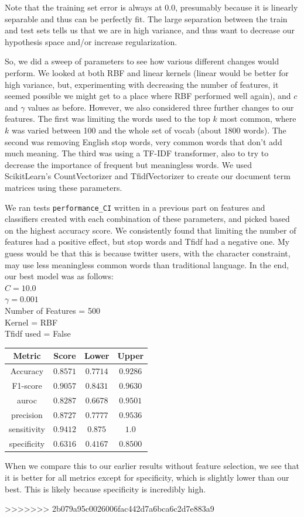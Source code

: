 \documentclass[11pt]{article}
\begin{document}
\begin{enumerate}
Note that the training set error is always at 0.0, presumably because it is linearly separable and thus can be 
perfectly fit. The large separation between the train and test sets tells us that we are in high variance, and 
thus want to decrease our hypothesis space and/or increase regularization.

So, we did a sweep of parameters to see how various different changes would perform. We looked at 
both RBF and linear kernels (linear would be better for high variance, but, experimenting with decreasing the number of features, it seemed possible we might get to a place where RBF performed well again), and $c$
and $\gamma$ values as before. However, we also considered three further changes to our features. The 
first was limiting the words used to the top $k$ most common, where $k$ was varied between 100 and the whole
set of vocab (about 1800 words). The second was removing English stop words, very common words that don't add much meaning. The third was using a TF-IDF transformer, also to try to decrease the importance of frequent but meaningless words. We used ScikitLearn's CountVectorizer and TfidfVectorizer to create our document term matrices using these parameters. 

We ran tests \texttt{performance\_CI} written in a previous part on features and classifiers created with each combination of these parameters, and picked based on the highest accuracy score. We consistently found that limiting the number of features had a positive effect, but stop words and Tfidf had a negative one. My guess would be that this is because twitter users, with the character constraint, may use less meaningless common words than traditional language. In the end, our best model was as follows:
\\$C=10.0$
\\$\gamma = 0.001$
\\Number of Features = 500
\\Kernel = RBF
\\ Tfidf used = False

\begin{tabular}{| c | c | c | c |}
\hline
Metric & Score & Lower & Upper \\
\hline
Accuracy & $0.8571$ & $0.7714$ & $0.9286$ \\
F1-score & $0.9057$ & $0.8431$ & $0.9630$ \\
auroc & $0.8287$ & $0.6678$ & $0.9501$ \\
precision & $0.8727$ & $0.7777$ & $0.9536$ \\
sensitivity & $0.9412$ & $0.875$ & $1.0$ \\
specificity & $0.6316$ & $0.4167$ & $0.8500$ \\
\hline
\end{tabular}

When we compare this to our earlier results without feature selection, we see that it is better for all metrics
except for specificity, which is slightly lower than our best. This is likely because specificity is incredibly high. 

>>>>>>> 2b079a95c0026006fac442d7a6bca6c2d7e883a9
\end{enumerate}
\end{document}

